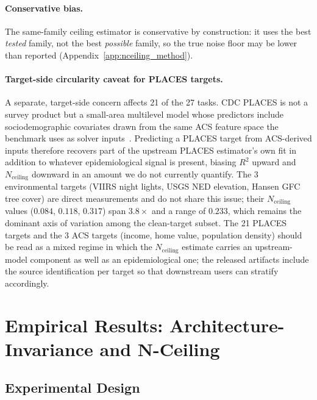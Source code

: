 \documentclass{article}
\begin{document}
\paragraph{Conservative bias.} The same-family ceiling estimator is conservative by construction: it uses the best \emph{tested} family, not the best \emph{possible} family, so the true noise floor may be lower than reported (Appendix~\ref{app:nceiling_method}).

\paragraph{Target-side circularity caveat for PLACES targets.} A separate, target-side concern affects 21 of the 27 tasks. CDC PLACES is not a survey product but a small-area multilevel model whose predictors include sociodemographic covariates drawn from the same ACS feature space the benchmark uses as solver inputs~\citep{cdcplaces2025methodology}. Predicting a PLACES target from ACS-derived inputs therefore recovers part of the upstream PLACES estimator's own fit in addition to whatever epidemiological signal is present, biasing $R^2$ upward and $N_{\text{ceiling}}$ downward in an amount we do not currently quantify. The 3 environmental targets (VIIRS night lights, USGS NED elevation, Hansen GFC tree cover) are direct measurements and do not share this issue; their $N_{\text{ceiling}}$ values ($0.084$, $0.118$, $0.317$) span $3.8{\times}$ and a range of $0.233$, which remains the dominant axis of variation among the clean-target subset. The 21 PLACES targets and the 3 ACS targets (income, home value, population density) should be read as a mixed regime in which the $N_{\text{ceiling}}$ estimate carries an upstream-model component as well as an epidemiological one; the released artifacts include the source identification per target so that downstream users can stratify accordingly.

\section{Empirical Results: Architecture-Invariance and N-Ceiling}
\label{sec:geo}

\subsection{Experimental Design}
\end{document}
